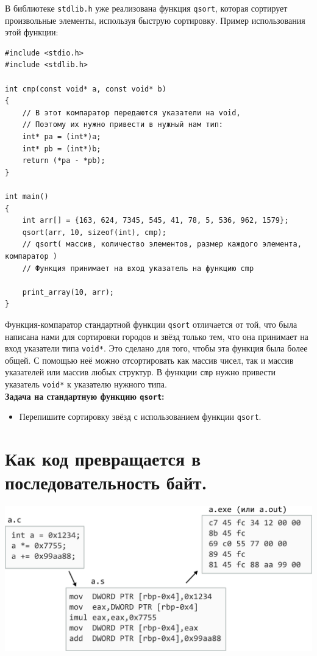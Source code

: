 \documentclass{article}
\begin{document}
В библиотеке \texttt{stdlib.h} уже реализована функция \texttt{qsort}, которая сортирует произвольные элементы, используя быструю сортировку. Пример использования этой функции:
\begin{lstlisting}
#include <stdio.h>
#include <stdlib.h>

int cmp(const void* a, const void* b)
{
    // В этот компаратор передаются указатели на void,
    // Поэтому их нужно привести в нужный нам тип:
    int* pa = (int*)a;
    int* pb = (int*)b;
    return (*pa - *pb);
}

int main()
{
    int arr[] = {163, 624, 7345, 545, 41, 78, 5, 536, 962, 1579};
    qsort(arr, 10, sizeof(int), cmp);
    // qsort( массив, количество элементов, размер каждого элемента, компаратор )
    // Функция принимает на вход указатель на функцию cmp
   
    print_array(10, arr);
}
\end{lstlisting}
Функция-компаратор стандартной функции \texttt{qsort} отличается от той, что была написана нами для сортировки
городов и звёзд только тем, что она принимает на вход указатели типа \texttt{void*}. Это сделано для того, чтобы эта функция была более общей. С помощью неё можно отсортировать как массив чисел, так и массив указателей или массив любых структур. В функции \texttt{cmp} нужно привести указатель \texttt{void*} к указателю нужного типа.\\
\textbf{Задача на стандартную функцию \texttt{qsort}:}
\begin{itemize}
\item Перепишите сортировку звёзд с использованием функции \texttt{qsort}.
\end{itemize}



\newpage
\section*{Как код превращается в последовательность байт.}
\begin{center}
\includegraphics[scale=0.9]{../images/code_to_hex.png}
\end{center}
\end{document}
